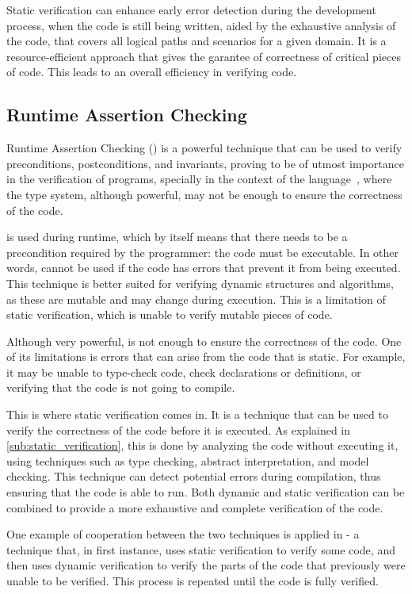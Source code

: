 Static verification can enhance early error detection during the development process, when the code is still 
being written, aided by the exhaustive analysis of the code, that covers all logical paths and scenarios for 
a given domain. It is a resource-efficient approach that gives the garantee of correctness of critical 
pieces of code. This leads to an overall efficiency in verifying code.

\subsection{Runtime Assertion Checking}
\label{sub:rac}

Runtime Assertion Checking (\rac) is a powerful technique that can be used to verify preconditions, postconditions, and 
invariants, proving to be of utmost importance in the verification of programs, specially 
in the context of the \ocaml language~\cite{Filliatre}, where the type system, 
although powerful, may not be enough to ensure the correctness of the code.

\rac is used during runtime, which by itself means that there needs to be a precondition required 
by the programmer: the code must be executable. In other words, \rac cannot be used if the code 
has errors that prevent it from being executed. This technique is better suited for verifying dynamic 
structures and algorithms, as these are mutable and may change during execution. This is a limitation 
of static verification, which is unable to verify mutable pieces of code.

Although very powerful, \rac is not enough to ensure the correctness of the code. One of its 
limitations is errors that can arise from the code that is static. For example, it may be unable 
to type-check code, check declarations or definitions, or verifying that the code is not going to 
compile.

This is where static verification comes in. It is a technique that can be used to verify the 
correctness of the code before it is executed. As explained in \ref{sub:static_verification}, this is done by analyzing the code without 
executing it, using techniques such as type checking, abstract interpretation, and model checking.
This technique can detect potential errors during compilation, thus ensuring that the code is 
able to run. Both dynamic and static verification can be combined to provide a more exhaustive 
and complete verification of the code.

One example of cooperation between the two techniques is applied in \monitors - a technique that, 
in first instance, uses static verification to verify some code, and then uses dynamic verification 
to verify the parts of the code that previously were unable to be verified. This process is repeated until 
the code is fully verified.

